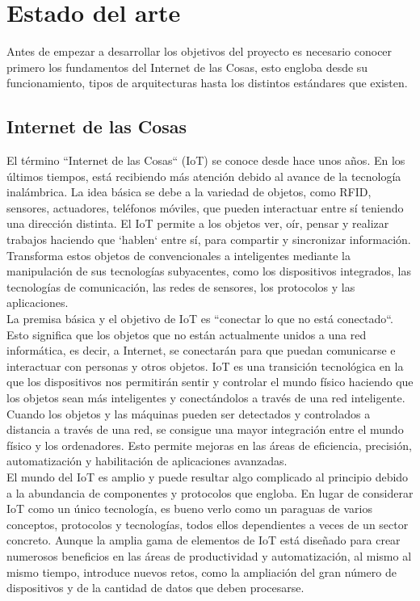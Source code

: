 \chapter{Estado del arte}

{\color{blue}

Antes de empezar a desarrollar los objetivos del proyecto es necesario conocer primero los fundamentos del Internet de las Cosas, esto engloba desde su funcionamiento, tipos de arquitecturas hasta los distintos estándares que existen.

\section{Internet de las Cosas} \label{sec:iot}

El término ``Internet de las Cosas`` (IoT) se conoce desde hace unos años. En los últimos tiempos, está recibiendo más atención debido al avance de la tecnología inalámbrica. La idea básica se debe a la variedad de objetos, como RFID, sensores, actuadores, teléfonos móviles, que pueden interactuar entre sí teniendo una dirección distinta. El IoT permite a los objetos ver, oír, pensar y realizar trabajos haciendo que `hablen` entre sí, para compartir y sincronizar información. Transforma estos objetos de convencionales a inteligentes mediante la manipulación de sus tecnologías subyacentes, como los dispositivos integrados, las tecnologías de comunicación, las redes de sensores, los protocolos y las aplicaciones. \cite{7589556} \\

La premisa básica y el objetivo de IoT es ``conectar lo que no está conectado``. Esto significa que los objetos que no están actualmente unidos a una red informática, es decir, a Internet, se conectarán para que puedan comunicarse e interactuar con personas y otros objetos. IoT es una transición tecnológica en la que los dispositivos nos permitirán sentir y controlar el mundo físico haciendo que los objetos sean más inteligentes y conectándolos a través de una red inteligente. Cuando los objetos y las máquinas pueden ser detectados y controlados a distancia a través de una red, se consigue una mayor integración entre el mundo físico y los ordenadores. Esto permite mejoras en las áreas de eficiencia, precisión, automatización y habilitación de aplicaciones avanzadas. \\

El mundo del IoT es amplio y puede resultar algo complicado al principio debido a la abundancia de componentes y protocolos que engloba. En lugar de considerar IoT como un único tecnología, es bueno verlo como un paraguas de varios conceptos, protocolos y tecnologías, todos ellos dependientes a veces de un sector concreto. Aunque la amplia gama de elementos de IoT está diseñado para crear numerosos beneficios en las áreas de productividad y automatización, al mismo al mismo tiempo, introduce nuevos retos, como la ampliación del gran número de dispositivos y de la cantidad de datos que deben procesarse. \cite{hanes2017iot}

}
